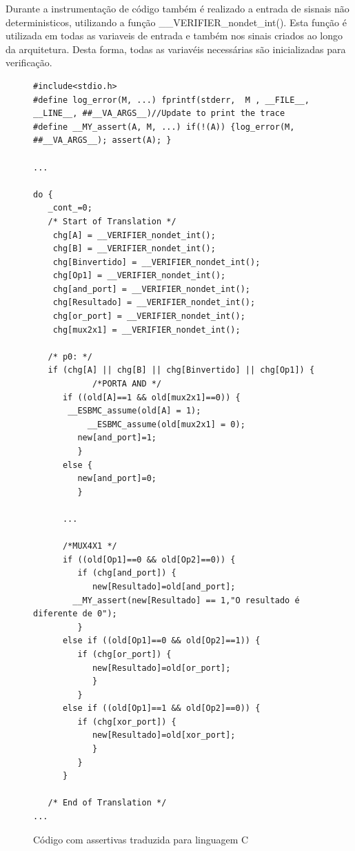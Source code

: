 \par
Durante a instrumentação de código também é realizado a entrada de sisnais não deterministicos, utilizando a função \_\_VERIFIER\_nondet\_int(). Esta função é utilizada em todas as variaveis de entrada e também nos sinais criados ao longo da arquitetura. Desta forma, todas as variavéis necessárias são inicializadas para verificação.
\begin{figure}[htp]
\caption{\label{fig:assert_c} Código com assertivas traduzida para linguagem C}
	\begin{center}
    \begin{minipage}{0.99\textwidth}
    \begin{lstlisting}       
#include<stdio.h>
#define log_error(M, ...) fprintf(stderr,  M , __FILE__, __LINE__, ##__VA_ARGS__)//Update to print the trace
#define __MY_assert(A, M, ...) if(!(A)) {log_error(M, ##__VA_ARGS__); assert(A); }

...

do {
   _cont_=0;
   /* Start of Translation */
    chg[A] = __VERIFIER_nondet_int(); 
    chg[B] = __VERIFIER_nondet_int(); 
    chg[Binvertido] = __VERIFIER_nondet_int(); 
    chg[Op1] = __VERIFIER_nondet_int();
    chg[and_port] = __VERIFIER_nondet_int();
    chg[Resultado] = __VERIFIER_nondet_int();
    chg[or_port] = __VERIFIER_nondet_int();
    chg[mux2x1] = __VERIFIER_nondet_int();

   /* p0: */
   if (chg[A] || chg[B] || chg[Binvertido] || chg[Op1]) {
            /*PORTA AND */
      if ((old[A]==1 && old[mux2x1]==0)) {
	   __ESBMC_assume(old[A] = 1);
           __ESBMC_assume(old[mux2x1] = 0);
         new[and_port]=1;
         }
      else {
         new[and_port]=0;
         }

      ...

      /*MUX4X1 */
      if ((old[Op1]==0 && old[Op2]==0)) {
         if (chg[and_port]) {
            new[Resultado]=old[and_port];
	    __MY_assert(new[Resultado] == 1,"O resultado é diferente de 0");
         }
      else if ((old[Op1]==0 && old[Op2]==1)) {
         if (chg[or_port]) {
            new[Resultado]=old[or_port];
            }
         }
      else if ((old[Op1]==1 && old[Op2]==0)) {
         if (chg[xor_port]) {
            new[Resultado]=old[xor_port];
            }
         }
      }

   /* End of Translation */
...
    \end{lstlisting}
    \end{minipage}
	\end{center}
\end{figure}

